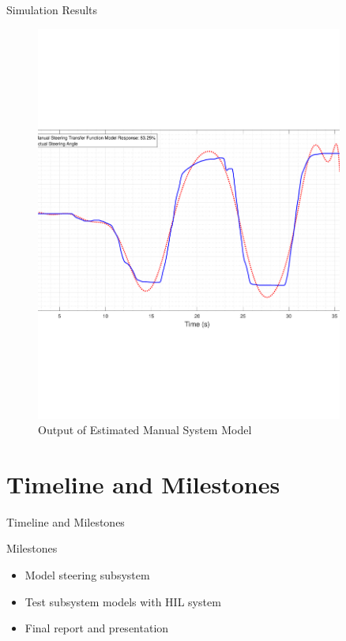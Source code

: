\documentclass{beamer}
\begin{document}
\begin{frame}{Simulation Results}
\begin{block}{}
\begin{figure}
\begin{minipage}{0.45\textwidth}
        \includegraphics[width=0.9\textwidth]{figs/img/manualSteeringTransferFunctionModel} %
        \caption{Output of Estimated Manual System Model}
        \label{fig:manualSteerModel}
    \end{minipage}
\end{figure}
  \end{block}
\end{frame}

\section{Timeline and Milestones}

\begin{frame}{Timeline and Milestones}
  \begin{block}{Milestones}
 \begin{itemize}
        \item Model steering subsystem 
	\item Test subsystem models with HIL system 
	\item Final report and presentation 
\end{itemize}
  \end{block}
\end{frame}
\end{document}
